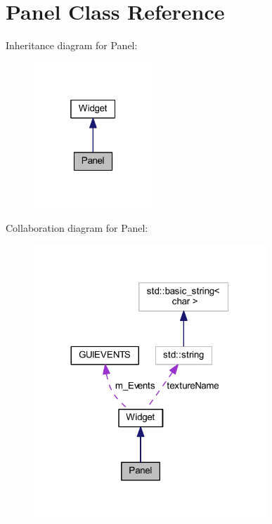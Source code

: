\hypertarget{class_panel}{}\section{Panel Class Reference}
\label{class_panel}


Inheritance diagram for Panel\+:
\nopagebreak
\begin{figure}[H]
\begin{center}
\leavevmode
\includegraphics[width=127pt]{class_panel__inherit__graph}
\end{center}
\end{figure}


Collaboration diagram for Panel\+:
\nopagebreak
\begin{figure}[H]
\begin{center}
\leavevmode
\includegraphics[width=248pt]{class_panel__coll__graph}
\end{center}
\end{figure}
